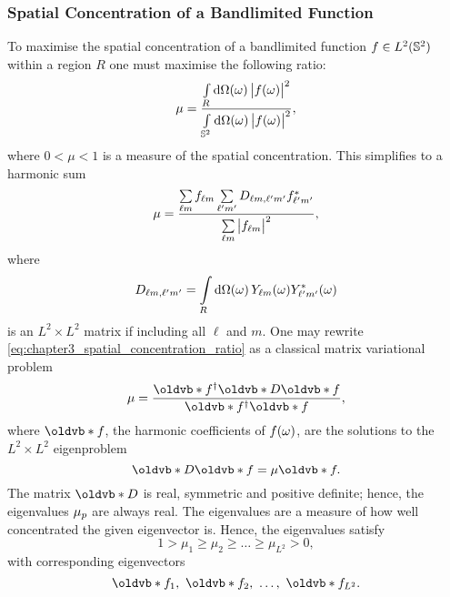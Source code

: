 

\subsubsection{Spatial Concentration of a Bandlimited Function}

To maximise the spatial concentration of a bandlimited function \(f \in \hilbert{\twoSphere}\) within a region \(R\) one must maximise the following ratio:
%
\begin{equation}
	\mu
	= \frac{\integrateRegion{\sphereVolume} \abs{\pixel{f}}^{2}}{\integrateSphere{\omega} \abs{\pixel{f}}^{2}},
\end{equation}
%
where \(0 < \mu < 1\) is a measure of the spatial concentration.
This simplifies to a harmonic sum
%
\begin{equation}\label{eq:chapter3_spatial_concentration_ratio}
	\mu
	= \frac{\harmonicSum \harmonic{f} \harmonicSum['] \Dmatrix \conj{\harmonic[']{f}}}{\harmonicSum \abs{\harmonic{f}}^{2}},
\end{equation}
%
where
%
\begin{equation}
	\Dmatrix
	= \integrateRegion{\sphereVolume} \pixel{\harmonic{Y}} \pixel{\conj{\harmonic[']{Y}}}
\end{equation}
%
is an \(L^{2} \times{} L^{2}\) matrix if including all \(\ell{}\) and \(m\).
One may rewrite \cref{eq:chapter3_spatial_concentration_ratio} as a classical matrix variational problem
%
\begin{equation}
	\mu
	= \frac{\hermitian{\vb{f}} \vb{D} \vb{f}}{\hermitian{\vb{f}}\vb{f}},
\end{equation}
%
where \(\vb{f}\), the harmonic coefficients of \(\pixel{f}\), are the solutions to the \(L^{2} \times{} L^{2}\) eigenproblem
%
\begin{equation}\label{eq:chapter3_eigenproblem}
	\vb{D}\vb{f}
	= \mu\vb{f}.
\end{equation}
%
The matrix \(\vb{D}\) is real, symmetric and positive definite; hence, the eigenvalues \(\slepian{\mu}\) are always real.
The eigenvalues are a measure of how well concentrated the given eigenvector is.
Hence, the eigenvalues satisfy
%
\begin{equation}
	1 > \mu_{1} \geq \mu_{2} \geq \ldots \geq \mu_{L^{2}} > 0, %
\end{equation}
%
with corresponding eigenvectors
%
\begin{equation}
	\vb{f}_{1},\ \vb{f}_{2},\ \ldots,\ \vb{f}_{L^{2}}.
\end{equation}
